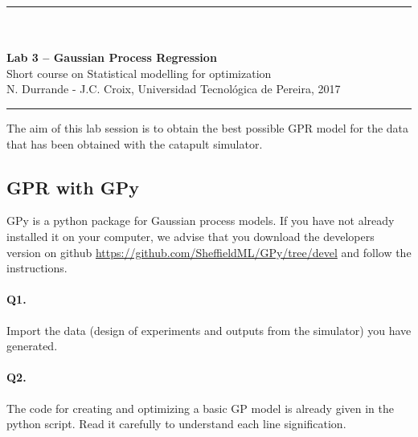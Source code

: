 \documentclass[12pt]{scrartcl}
\begin{document}
\begin{center}
	\rule{\textwidth}{1pt}
	\\ \ \\
	{\LARGE \textbf{Lab 3 -- Gaussian Process Regression}}\\
	\vspace{3mm}
	{\large Short course on Statistical modelling for optimization\\ \vspace{3mm}}
	{\normalsize N. Durrande - J.C. Croix, Universidad Tecnol\'ogica de Pereira, 2017}\\
	\vspace{3mm}
	\rule{\textwidth}{1pt}
	\vspace{5mm}
\end{center}
The aim of this lab session is to obtain the best possible GPR model for the data that has been obtained with the catapult simulator.

\subsection*{GPR with GPy}
GPy is a python package for Gaussian process models. If you have not already installed it on your computer, we advise that you download the developers version on github \url{https://github.com/SheffieldML/GPy/tree/devel} and follow the instructions.%

\paragraph{Q1.} Import the data (design of experiments and outputs from the simulator) you have generated.

\paragraph{Q2.}
The code for creating and optimizing a basic GP model is already given in the python script. Read it carefully to understand each line signification.
\end{document}
